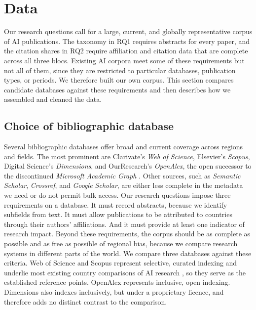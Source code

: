 \documentclass[10pt,twocolumn,a4paper]{article}
\begin{document}
	\section{Data}
	\label{sec:data}
	
	Our research questions call for a large, current, and globally representative corpus of AI publications. The taxonomy in RQ1 requires abstracts for every paper, and the citation shares in RQ2 require affiliation and citation data that are complete across all three blocs. Existing AI corpora meet some of these requirements but not all of them, since they are restricted to particular databases, publication types, or periods. We therefore built our own corpus. This section compares candidate databases against these requirements and then describes how we assembled and cleaned the data.
	
	\subsection{Choice of bibliographic database}
	\label{sec:database}
	
	Several bibliographic databases offer broad and current coverage across regions and fields. The most prominent are Clarivate's \textit{Web of Science}, Elsevier's \textit{Scopus}, Digital Science's \textit{Dimensions}, and OurResearch's \textit{OpenAlex}, the open successor to the discontinued \textit{Microsoft Academic Graph} \parencite{visser2021large}. Other sources, such as \textit{Semantic Scholar}, \textit{Crossref}, and \textit{Google Scholar}, are either less complete in the metadata we need or do not permit bulk access. Our research questions impose three requirements on a database. It must record abstracts, because we identify subfields from text. It must allow publications to be attributed to countries through their authors' affiliations. And it must provide at least one indicator of research impact. Beyond these requirements, the corpus should be as complete as possible and as free as possible of regional bias, because we compare research systems in different parts of the world. We compare three databases against these criteria. Web of Science and Scopus represent selective, curated indexing and underlie most existing country comparisons of AI research \parencite{hellwig2019ai,almarzouqi2024comparative}, so they serve as the established reference points. OpenAlex represents inclusive, open indexing. Dimensions also indexes inclusively, but under a proprietary licence, and therefore adds no distinct contrast to the comparison.
	
\end{document}
